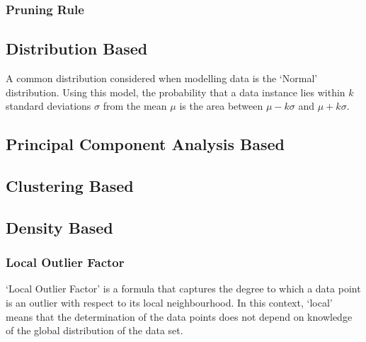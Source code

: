 \subsubsection{Pruning Rule}
\label{anomalyDetection:approaches:distance:pruning}

\subsection{Distribution Based}
\label{anomalyDetection:approaches:distribution}
A common distribution considered when modelling data is the `Normal'
distribution. Using this model, the probability that a data instance lies within
$k$ standard deviations $\sigma$ from the mean $\mu$ is the area between
$\mu - k\sigma$ and $\mu + k\sigma$.

\subsection{Principal Component Analysis Based}
\label{anomalyDetection:pca}

\subsection{Clustering Based}
\label{anomalyDetection:clustering}

\subsection{Density Based}
\label{anomalyDetection:density}

\subsubsection{Local Outlier Factor}
\label{localOutlierFactor}
`Local Outlier Factor' is a formula that captures the degree to which a data
point is an outlier with respect to its local neighbourhood. In this context,
`local' means that the determination of the data points does not depend on
knowledge of the global distribution of the data set.

